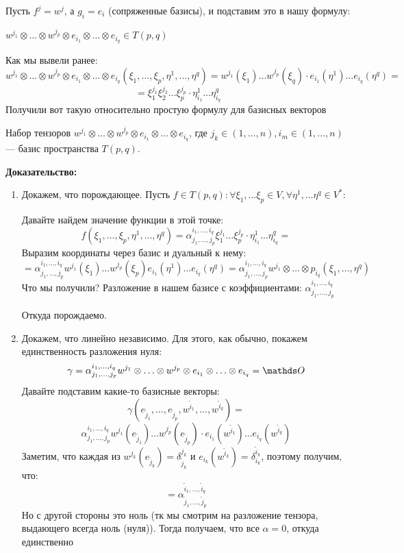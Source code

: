 Пусть $f^j = w^j$, а $g_i = e_i$ (сопряженные базисы), и подставим это в нашу формулу:

$w^{j_1} \otimes \ldots \otimes w^{j_p} \otimes e_{i_1} \otimes \ldots \otimes  e_{i_q}\in T(p,q) $

Как мы вывели ранее:
$$w^{j_1}\otimes \ldots \otimes w^{j_p} \otimes e_{i_1}\otimes \ldots \otimes e_{i_q} (\xi_1,\ldots , \xi_p, \eta^1,\ldots,\eta^q) = w^{j_1}(\xi_1)\ldots w^{j_p}(\xi_q)\cdot e_{i_1}(\eta^1)\ldots e_{i_q}(\eta^q) = $$
$$=\xi_1^{j_1}\xi_2^{j_2}\ldots \xi_p^{j_p} \cdot \eta_{i_1}^1 \ldots \eta_{i_q}^q $$
Получили вот такую относительно простую формулу для базисных векторов



Набор тензоров $w^{j_1}\otimes \ldots \otimes w^{j_p} \otimes e_{i_1}\otimes \ldots \otimes e_{i_q}$, где $j_k \in (1,\ldots,n),i_m\in(1,\ldots,n)$ --- базис пространства $T(p,q)$.

\textbf{Доказательство:}

\begin{enumerate}
    \item Докажем, что порождающее. Пусть $f\in T(p,q): \forall \xi_1,\ldots \xi_p \in V, \forall \eta^1,\ldots \eta^q\in V^*:$

    Давайте найдем значение функции в этой точке:
    $$f(\xi_1,\ldots, \xi_p,\eta^1,\ldots, \eta^q) = \alpha_{j_1,\ldots,j_p}^{i_1,\ldots,i_q}\xi_1^{j_1}\ldots \xi_{p}^{j_p}\cdot \eta_{i_1}^1 \ldots \eta_{i_q}^q = $$
    Выразим координаты через базис и дуальный к нему:
    $$=\alpha_{j_1,\ldots,j_p}^{i_1,\ldots,i_q} w^{j_1}(\xi_1)\ldots w^{j_p}(\xi_p) e_{i_1}(\eta^1)\ldots e_{i_q}(\eta^q) = \alpha_{j_1,\ldots,j_p}^{i_1,\ldots,i_q} w^{j_1}\otimes \ldots \otimes p_{i_q}(\xi_1,\ldots, \eta^q)$$
    Что мы получили? Разложение в нашем базисе с коэффициентами: $\alpha_{j_1,\ldots,j_p}^{i_1,\ldots,i_q} $

    Откуда порождаемо.
    \item Докажем, что линейно независимо. Для этого, как обычно, покажем единственность разложения нуля:
    $$\gamma = \alpha_{j_1,\ldots, j_p}^{i_1,\ldots,i_q}w^{j_1}\otimes\ldots\otimes w^{j_p}\otimes e_{i_1}\otimes \ldots \otimes e_{i_q}=\zero$$
    Давайте подставим какие-то базисные векторы:
    $$\gamma(e_{\widetilde{j}_1},\ldots, e_{\widetilde{j}_p}, w^{\widetilde{i}_1},\ldots, w^{\widetilde{i}_q}) = $$
    $$\alpha_{j_1,\ldots,j_p}^{i_1,\ldots,i_q}w^{j_1}(e_{\widetilde{j}_1})\ldots w^{j_p}(e_{\widetilde{j}_p}) \cdot e_{i_1}(w^{\widetilde{i}_1})\ldots e_{i_q}(w^{\widetilde{i}_q})$$
    Заметим, что каждая из $w^{j_k}(e_{\widetilde{j}_k}) = \delta_{\widetilde{j}_k}^{j_k}$ и $e_{i_k}(w^{\widetilde{i}_k}) = \delta^{\widetilde{i}_k}_{i_k}$, поэтому получим, что:
    $$ = \alpha_{\widetilde{j}_1,\ldots,\widetilde{j}_p}^{\widetilde{i}_1,\ldots, \widetilde{i}_q}$$
    Но с другой стороны это ноль (тк мы смотрим на разложение тензора, выдающего всегда ноль (нуля)). Тогда получаем, что все $\alpha = 0$, откуда единственно
\end{enumerate}


